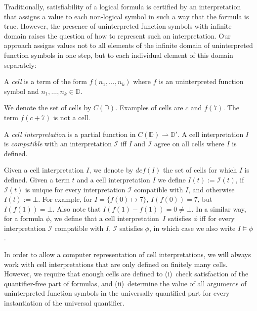 \documentclass[runningheads]{llncs}
\newcommand{\domain}{\mathbb{D}}
\newcommand{\codomain}{\mathbb{D}'}
\begin{document}
Traditionally, satisfiability of a logical formula is certified by an interpretation that assigns a value to each non-logical symbol in such a way that the formula is true. However, the presence of uninterpreted function symbols with infinite domain raises the question of how to represent such an interpretation.
Our approach assigns values not to all elements of the infinite domain of uninterpreted function symbols in one step, but to each individual element of this domain separately:
\begin{definition}[Cell]\label{def:cell}
	A \emph{cell} is a term of the form $f(n_1,\dots, n_k)$ where $f$ is an uninterpreted function symbol and $n_1,\dots, n_k\in \domain$.
\end{definition}
We denote the set of cells by $C(\domain)$.
Examples of cells are $c$ and $f(7)$. The term $f(c+7)$ is not a cell.

\begin{definition}
	A \emph{cell interpretation} is a partial function in $C(\domain)\rightharpoonup\codomain$. A cell interpretation $I$ is \emph{compatible} with an interpretation $\mathcal{I}$ iff $I$ and $\mathcal{I}$ agree on all cells where $I$ is defined.
\end{definition}

Given a cell interpretation $I$, we denote by $\mathit{def}(I)$ the set of cells for which $I$ is defined. Given a term $t$ and a cell interpretation $I$  we define $I(t):=\mathcal{I}(t)$, if  $\mathcal{I}(t)$ is unique for every interpretation $\mathcal{I}$ compatible with $I$, and otherwise $I(t):=\bot$.
For example, for $I=\{ f(0) \mapsto 7 \}$, $I(f(0))=7$, but $I(f(1))=\bot$. Also note that $I(f(1)-f(1))=0\neq\bot$. In a similar way, for a formula $\phi$, we define that a cell interpretation~$I$ satisfies $\phi$ iff for every interpretation $\mathcal{I}$ compatible with $I$, $\mathcal{I}$ satisfies $\phi$, in which case we also write $I\models \phi$.

In order to allow a computer representation of cell interpretations, we will always work with cell interpretations that are only defined on finitely many cells.
However, we require that enough cells are defined to (i)~check satisfaction of the quantifier-free part of formulas, and (ii)~determine the value of all arguments of uninterpreted function symbols in the universally quantified part for every instantiation of the universal quantifier.
\end{document}

